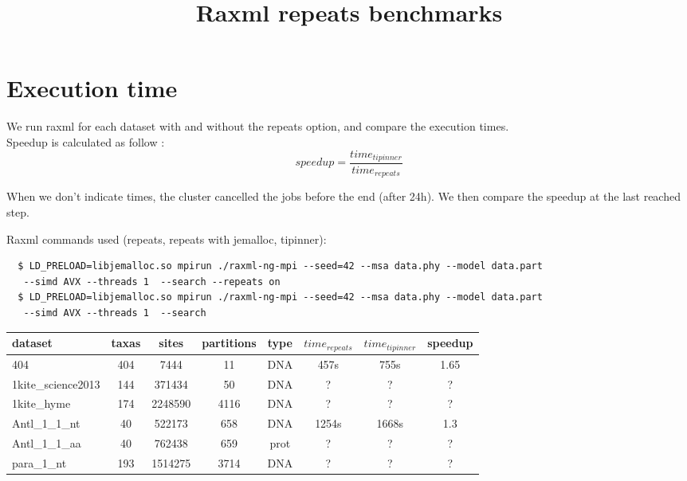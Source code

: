 \documentclass[a4paper]{article}
\begin{document}
\newcommand*{\figuretitle}[1]{%
    {\centering%
    \textbf{#1}%
    \par\medskip}%
}


\title{Raxml repeats benchmarks}
\maketitle


\section{Execution time}

\noindent We run raxml for each dataset with and without the repeats option, and compare the execution times.\\


\noindent Speedup is calculated as follow :  
$$ speedup = \frac{time_{tipinner}}{time_{repeats}}$$

When we don't indicate times, the cluster cancelled the jobs before the end (after 24h). We then compare the speedup at the last reached step. \newline

Raxml commands used (repeats, repeats with jemalloc, tipinner):
\lstset{language=sh}
\begin{lstlisting}
  $ LD_PRELOAD=libjemalloc.so mpirun ./raxml-ng-mpi --seed=42 --msa data.phy --model data.part
   --simd AVX --threads 1  --search --repeats on
  $ LD_PRELOAD=libjemalloc.so mpirun ./raxml-ng-mpi --seed=42 --msa data.phy --model data.part
   --simd AVX --threads 1  --search 
\end{lstlisting}


\begin{tabular}{|l|c|c|c|c|c|c|c|}
\hline dataset                    & taxas & sites    & partitions & type & $time_{repeats}$ & $time_{tipinner}$ & speedup\\
\hline 404                        & 404   &  7444    & 11         & DNA  & 457s     &  755s     & 1.65  \\
\hline 1kite\_science2013         & 144   &  371434  & 50         & DNA  & ?        &  ?        & ?  \\
\hline 1kite\_hyme                & 174   &  2248590 & 4116       & DNA  & ?        &  ?        & ? \\
\hline Antl\_1\_1\_nt             & 40    &  522173  & 658        & DNA  & 1254s    &  1668s    & 1.3  \\
\hline Antl\_1\_1\_aa             & 40    &  762438  & 659        & prot & ?        &  ?        & ?\\
\hline para\_1\_nt                & 193   &  1514275 & 3714       & DNA  & ?       &  ?        & ?  \\
\hline 
\end{tabular}\newline
\newline
\end{document}
